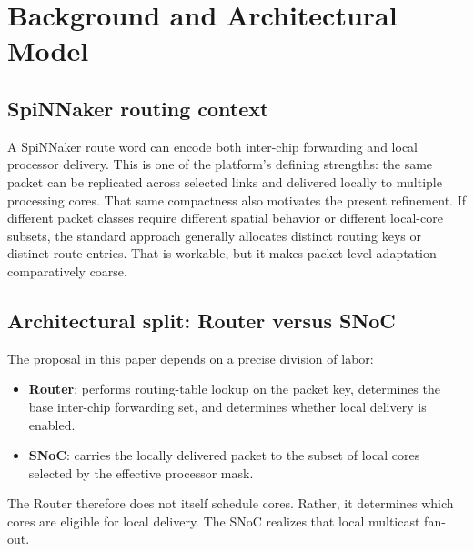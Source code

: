 \documentclass[11pt]{article}
\begin{document}
\section{Background and Architectural Model}
\subsection{SpiNNaker routing context}
A SpiNNaker route word can encode both inter-chip forwarding and local processor delivery. This is one of the platform's defining strengths: the same packet can be replicated across selected links and delivered locally to multiple processing cores. That same compactness also motivates the present refinement. If different packet classes require different spatial behavior or different local-core subsets, the standard approach generally allocates distinct routing keys or distinct route entries. That is workable, but it makes packet-level adaptation comparatively coarse.

\subsection{Architectural split: Router versus SNoC}
The proposal in this paper depends on a precise division of labor:
\begin{itemize}
    \item \textbf{Router}: performs routing-table lookup on the packet key, determines the base inter-chip forwarding set, and determines whether local delivery is enabled.
    \item \textbf{SNoC}: carries the locally delivered packet to the subset of local cores selected by the effective processor mask.
\end{itemize}
The Router therefore does not itself schedule cores. Rather, it determines which cores are eligible for local delivery. The SNoC realizes that local multicast fan-out.
\end{document}

